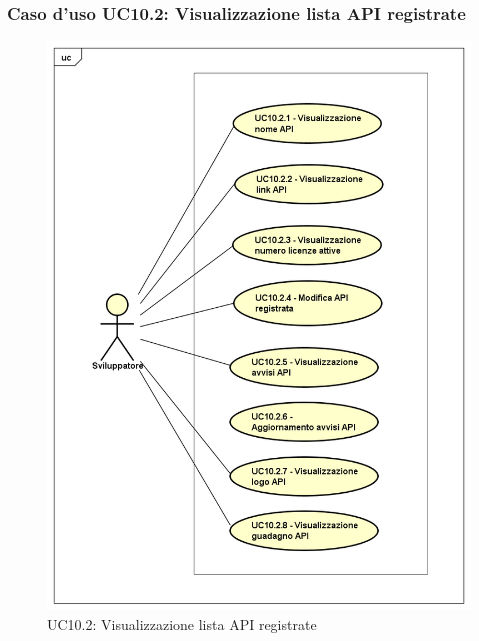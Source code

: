 \subsubsection{Caso d'uso UC10.2: Visualizzazione lista API registrate}
\label{UC10_2}
\begin{figure}[ht]
	\centering
	\includegraphics[scale=0.45]{UML/UC10_2.png}
	\caption{UC10.2: Visualizzazione lista API registrate}
\end{figure}

